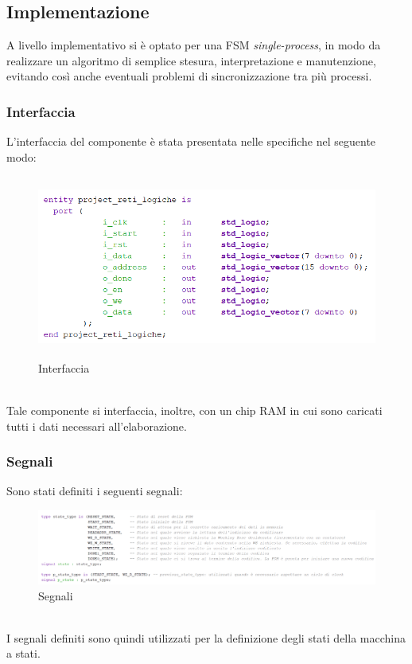 \documentclass{article}
\begin{document}
\subsection{Implementazione}
A livello implementativo si è optato per una FSM \textit{single-process}, in modo da realizzare un algoritmo di semplice stesura, interpretazione e manutenzione, evitando così anche eventuali problemi di sincronizzazione tra più processi.

\subsubsection{Interfaccia}
L'interfaccia del componente è stata presentata nelle specifiche nel seguente modo:
\begin{figure}[H]
    \centering
    \includegraphics[height=6cm]{images/interfaccia.png}
    \caption{Interfaccia}
    \label{fig:interfaccia}
\end{figure}
\noindent\\
Tale componente si interfaccia, inoltre, con un chip RAM in cui sono caricati tutti i dati
necessari all'elaborazione.

\subsubsection{Segnali}
Sono stati definiti i seguenti segnali:
\begin{figure}[H]
    \centering
    \includegraphics[width=1.0\textwidth]{images/segnali.png}
    \caption{Segnali}
    \label{fig:segnali}
\end{figure}
\noindent\\
I segnali definiti sono quindi utilizzati per la definizione degli stati della macchina a stati.
\end{document}
